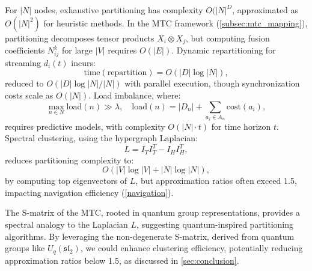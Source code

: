 \documentclass{amsart}
\begin{document}
For \( |N| \) nodes, exhaustive partitioning has complexity \( O(|N|^D \), approximated as \( O(|N|^2) \) for heuristic methods. In the MTC framework (\cref{subsec:mtc_mapping}), partitioning decomposes tensor products \( X_i \otimes X_j \), but computing fusion coefficients \( N_{ij}^k \) for large \( |V| \) requires \( O(|E|) \). Dynamic repartitioning for streaming \( d_i(t) \) incurs:
\[
\text{time}(\text{repartition}) = O(|D| \log |N|),
\]
reduced to \( O(|D| \log |N| / |N|) \) with parallel execution, though synchronization costs scale as \( O(|N|) \). Load imbalance, where:
\[
\max_{n \in N} \text{load}(n) \gg \lambda, \quad \text{load}(n) = |D_n| + \sum_{a_i \in A_n} \text{cost}(a_i),
\]
requires predictive models, with complexity \( O(|N| \cdot t) \) for time horizon \( t \). Spectral clustering, using the hypergraph Laplacian:
\[
L = I_T I_T^T - I_H I_H^T,
\]
reduces partitioning complexity to:
\[
O(|V| \log |V| + |N| \log |N|),
\]
by computing top eigenvectors of \( L \), but approximation ratios often exceed 1.5, impacting navigation efficiency (\cref{navigation}).

The S-matrix of the MTC, rooted in quantum group representations, provides a spectral analogy to the Laplacian \( L \), suggesting quantum-inspired partitioning algorithms. By leveraging the non-degenerate S-matrix, derived from quantum groups like \( U_q(\mathfrak{sl}_2) \), we could enhance clustering efficiency, potentially reducing approximation ratios below 1.5, as discussed in \cref{sec:conclusion}.

\end{document}
